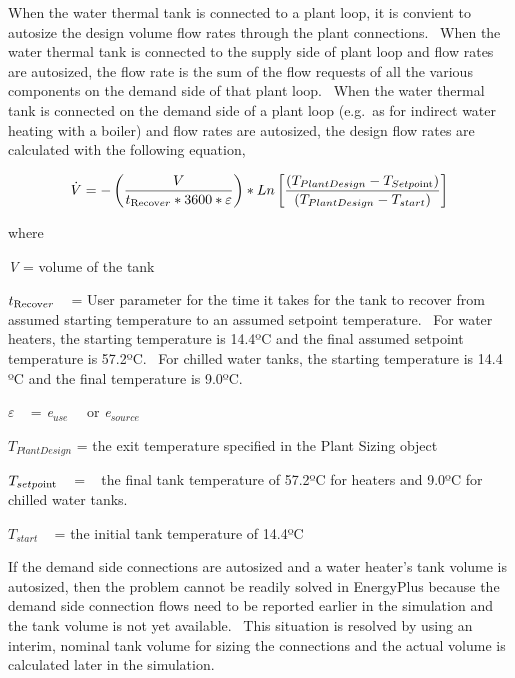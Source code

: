 When the water thermal tank is connected to a plant loop, it is convient to autosize the design volume flow rates through the plant connections.~ When the water thermal tank is connected to the supply side of plant loop and flow rates are autosized, the flow rate is the sum of the flow requests of all the various components on the demand side of that plant loop.~ When the water thermal tank is connected on the demand side of a plant loop (e.g.~as for indirect water heating with a boiler) and flow rates are autosized, the design flow rates are calculated with the following equation,

\begin{equation}
\dot V =  - \left( {\frac{V}{{{t_{{\mathop{\rm Re}\nolimits} {\mathop{\rm cov}} er}} * 3600 * \varepsilon }}} \right) * Ln\left[ {\frac{{\left( {{T_{PlantDesign}} - {T_{Setpo{\mathop{\rm int}} }}} \right)}}{{\left( {{T_{PlantDesign}} - {T_{start}}} \right)}}} \right]
\end{equation}

where

\emph{V} = volume of the tank

\({t_{{\mathop{\rm Re}\nolimits} {\mathop{\rm cov}} er}}\) ~ = User parameter for the time it takes for the tank to recover from assumed starting temperature to an assumed setpoint temperature.~ For water heaters, the starting temperature is 14.4ºC and the final assumed setpoint temperature is 57.2ºC.~ For chilled water tanks, the starting temperature is 14.4 ºC and the final temperature is 9.0ºC.

\(\varepsilon\) ~ = \emph{e\(_{use}\)} ~~or \emph{e\(_{source}\)}

\({T_{PlantDesign}}\) = the exit temperature specified in the Plant Sizing object

\({T_{setpo{\mathop{\rm int}} }}\) ~ = ~ the final tank temperature of 57.2ºC for heaters and 9.0ºC for chilled water tanks.

\({T_{start}}\) ~ = the initial tank temperature of 14.4ºC

If the demand side connections are autosized and a water heater's tank volume is autosized, then the problem cannot be readily solved in EnergyPlus because the demand side connection flows need to be reported earlier in the simulation and the tank volume is not yet available.~ This situation is resolved by using an interim, nominal tank volume for sizing the connections and the actual volume is calculated later in the simulation.
